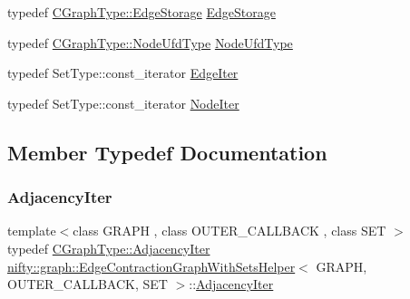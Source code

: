 \begin{DoxyCompactItemize}
\item 
typedef \hyperlink{classnifty_1_1graph_1_1EdgeContractionGraph_ad57e807f7df20892c7bbbb9b53d3aa08}{C\+Graph\+Type\+::\+Edge\+Storage} \hyperlink{structnifty_1_1graph_1_1EdgeContractionGraphWithSetsHelper_a2378dd6c8e82012a04236593971ac4e7}{Edge\+Storage}
\item 
typedef \hyperlink{classnifty_1_1graph_1_1EdgeContractionGraph_a7ff98238621f4b534e89b1880ee77239}{C\+Graph\+Type\+::\+Node\+Ufd\+Type} \hyperlink{structnifty_1_1graph_1_1EdgeContractionGraphWithSetsHelper_a254e8886638750a06342b813be34344d}{Node\+Ufd\+Type}
\item 
typedef Set\+Type\+::const\+\_\+iterator \hyperlink{structnifty_1_1graph_1_1EdgeContractionGraphWithSetsHelper_ab619625636cb861e740f216ea946fe06}{Edge\+Iter}
\item 
typedef Set\+Type\+::const\+\_\+iterator \hyperlink{structnifty_1_1graph_1_1EdgeContractionGraphWithSetsHelper_a6d07b232c0af5bf7170edb2eea02a8fb}{Node\+Iter}
\end{DoxyCompactItemize}


\subsection{Member Typedef Documentation}
\mbox{\label{structnifty_1_1graph_1_1EdgeContractionGraphWithSetsHelper_a9d9969291ab3cf558c7ad2f00a2c189d}} 
\subsubsection{\texorpdfstring{Adjacency\+Iter}{AdjacencyIter}}
{\footnotesize\ttfamily template$<$class G\+R\+A\+PH , class O\+U\+T\+E\+R\+\_\+\+C\+A\+L\+L\+B\+A\+CK , class S\+ET $>$ \\
typedef \hyperlink{classnifty_1_1graph_1_1EdgeContractionGraph_a447212f5ced0c4ef4d304e8b89f4f200}{C\+Graph\+Type\+::\+Adjacency\+Iter} \hyperlink{structnifty_1_1graph_1_1EdgeContractionGraphWithSetsHelper}{nifty\+::graph\+::\+Edge\+Contraction\+Graph\+With\+Sets\+Helper}$<$ G\+R\+A\+PH, O\+U\+T\+E\+R\+\_\+\+C\+A\+L\+L\+B\+A\+CK, S\+ET $>$\+::\hyperlink{structnifty_1_1graph_1_1EdgeContractionGraphWithSetsHelper_a9d9969291ab3cf558c7ad2f00a2c189d}{Adjacency\+Iter}}

